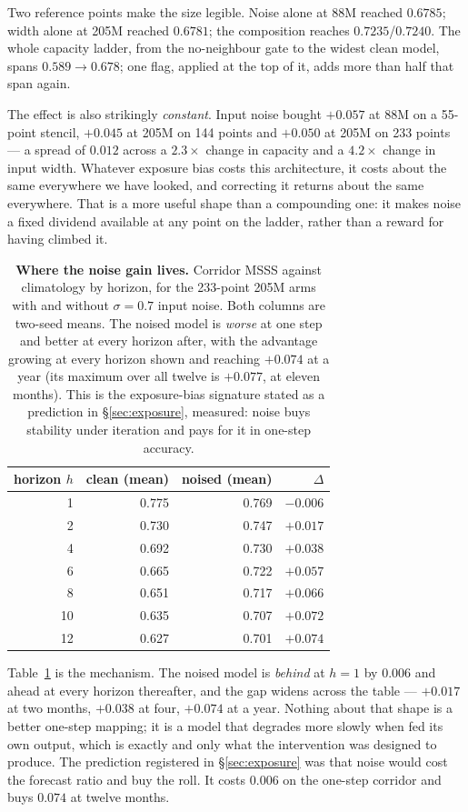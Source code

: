 \documentclass[10pt]{article}
\begin{document}
Two reference points make the size legible. Noise alone at 88M reached
$0.6785$; width alone at 205M reached $0.6781$; the composition reaches
$\mathbf{0.7235}$/$\mathbf{0.7240}$. The whole capacity ladder, from the
no-neighbour gate to the widest clean model, spans $0.589 \to 0.678$;
one flag, applied at the top of it, adds more than half that span again.

The effect is also strikingly \emph{constant}. Input noise bought
$+0.057$ at 88M on a 55-point stencil, $+0.045$ at 205M on 144 points
and $+0.050$ at 205M on 233 points --- a spread of $0.012$ across a
$2.3\times$ change in capacity and a $4.2\times$ change in input width.
Whatever exposure bias costs this architecture, it costs about the same
everywhere we have looked, and correcting it returns about the same
everywhere. That is a more useful shape than a compounding one: it makes
noise a fixed dividend available at any point on the ladder, rather than
a reward for having climbed it.

\begin{table}[htbp]
\centering\small
\begin{tabular}{rrrr}
\toprule
horizon $h$ & clean (mean) & noised (mean) & $\Delta$ \\
\midrule
1  & 0.775 & 0.769 & $-0.006$ \\
2  & 0.730 & 0.747 & $+0.017$ \\
4  & 0.692 & 0.730 & $+0.038$ \\
6  & 0.665 & 0.722 & $+0.057$ \\
8  & 0.651 & 0.717 & $+0.066$ \\
10 & 0.635 & 0.707 & $+0.072$ \\
12 & 0.627 & 0.701 & $+0.074$ \\
\bottomrule
\end{tabular}
\caption{\textbf{Where the noise gain lives.} Corridor MSSS against
climatology by horizon, for the 233-point 205M arms with and without
$\sigma{=}0.7$ input noise. Both columns are two-seed means. The noised
model is \emph{worse} at one step and better at every horizon after,
with the advantage growing at every horizon shown and reaching
$+0.074$ at a year (its maximum over all twelve is $+0.077$, at eleven
months). This is the exposure-bias
signature stated as a prediction in \S\ref{sec:exposure}, measured:
noise buys stability under iteration and pays for it in one-step
accuracy.}
\label{tab:noisehorizon}
\end{table}

Table~\ref{tab:noisehorizon} is the mechanism. The noised model is
\emph{behind} at $h{=}1$ by $0.006$ and ahead at every horizon
thereafter, and the gap widens across the table --- $+0.017$ at two
months, $+0.038$ at four, $+0.074$ at a year. Nothing about that shape
is a better one-step mapping; it is a model that degrades more slowly
when fed its own output, which is exactly and only what the
intervention was designed to produce. The prediction registered in
\S\ref{sec:exposure} was that noise would cost the forecast ratio and
buy the roll. It costs $0.006$ on the one-step corridor and buys
$0.074$ at twelve months.
\end{document}
